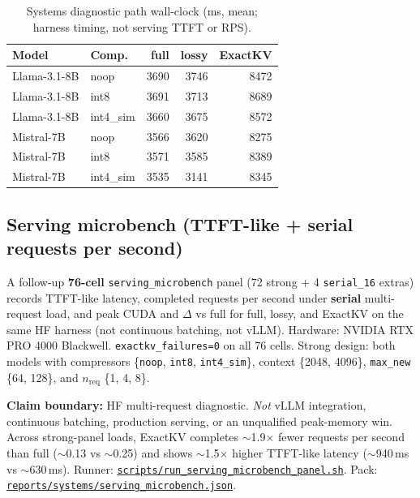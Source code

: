 \documentclass[11pt]{article}
\begin{document}
\begin{table}[htbp]
\centering\footnotesize
\caption{Systems diagnostic path wall-clock (ms, mean; harness timing, not serving TTFT or RPS).}
\label{tab:systems-wall-clock}
\begin{tabular}{@{}llrrr@{}}
\toprule
Model & Comp. & full & lossy & ExactKV \\ \midrule
Llama-3.1-8B & noop & 3690 & 3746 & 8472 \\
Llama-3.1-8B & int8 & 3691 & 3713 & 8689 \\
Llama-3.1-8B & int4\_sim & 3660 & 3675 & 8572 \\
Mistral-7B & noop & 3566 & 3620 & 8275 \\
Mistral-7B & int8 & 3571 & 3585 & 8389 \\
Mistral-7B & int4\_sim & 3535 & 3141 & 8345 \\
\bottomrule
\end{tabular}
\end{table}

\subsection{Serving microbench (TTFT-like + serial requests per second)}
A follow-up \textbf{76-cell} \texttt{serving\_microbench} panel (72 strong + 4
\texttt{serial\_16} extras) records TTFT-like latency, completed requests per second under
\textbf{serial} multi-request load, and peak CUDA and $\Delta$ vs full for full, lossy,
and ExactKV on the same HF harness (not continuous batching, not vLLM).
Hardware: NVIDIA RTX PRO 4000 Blackwell. \texttt{exactkv\_failures=0} on all 76 cells.
Strong design: both models with compressors \{\texttt{noop}, \texttt{int8}, \texttt{int4\_sim}\},
context \{2048, 4096\}, \texttt{max\_new} \{64, 128\}, and $n_{\mathrm{req}}$ \{1, 4, 8\}.

\begin{sloppypar}
\noindent\textbf{Claim boundary:} HF multi-request diagnostic.
\emph{Not} vLLM integration, continuous batching, production serving, or an unqualified
peak-memory win.
Across strong-panel loads, ExactKV completes $\sim$1.9$\times$ fewer requests per second than
full ($\sim$0.13 vs $\sim$0.25) and shows $\sim$1.5$\times$ higher TTFT-like latency
($\sim$940\,ms vs $\sim$630\,ms). Runner:
\href{https://github.com/utkarshg20/ExactKV/blob/main/scripts/run_serving_microbench_panel.sh}{\texttt{scripts/run\_serving\_microbench\_panel.sh}}.
Pack:
\href{https://github.com/utkarshg20/ExactKV/blob/main/reports/systems/serving_microbench.json}{\texttt{reports/systems/serving\_microbench.json}}.
\end{sloppypar}
\end{document}
